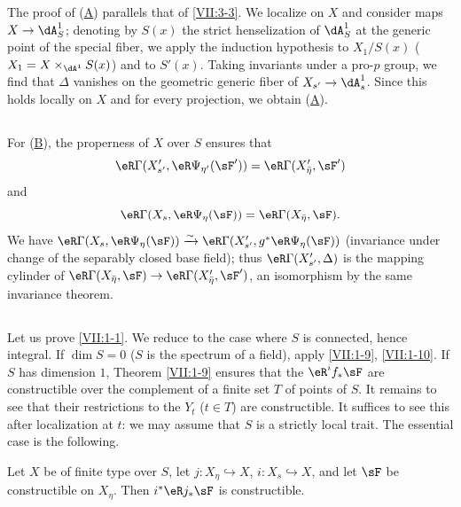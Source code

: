 The proof of (\hyperlink{VII:3-A}{A}) parallels that of \ref{VII:3-3}. We
localize on $X$ and consider maps $X\to \dA_S^1$; denoting by $S(x)$ the
strict henselization of $\dA_S^1$ at the generic point of the special fiber,
we apply the induction hypothesis to $X_1/S(x)$
($X_1=X\times_{\dA^1} S(x)$) and to $S'(x)$. Taking invariants under a pro-$p$
group, we find that $\Delta$ vanishes on the geometric generic fiber of
$X_{s'} \to \dA_s^1$. Since this holds locally on $X$ and for every
projection, we obtain (\hyperlink{VII:3-A}{A}).






\subsection{}\label{VII:3-9}

For (\hyperlink{VII:3-B}{B}), the properness of $X$ over $S$ ensures that
\[
  \eR\Gamma(X_{s'}',\eR\Psi_{\eta'}(\sF')) = \eR\Gamma(X_{\bar\eta}',\sF') 
\]
and
\[
  \eR\Gamma(X_s,\eR\Psi_\eta(\sF)) = \eR\Gamma(X_{\bar\eta},\sF) \text{.} 
\]
We have
$\eR\Gamma(X_s,\eR\Psi_\eta(\sF))\iso \eR\Gamma(X_{s'}',g^\ast\eR\Psi_\eta(\sF))$
(invariance under change of the separably closed base field); thus
$\eR\Gamma(X_{s'}', \Delta)$ is the mapping cylinder of
$\eR\Gamma(X_{\bar\eta},\sF) \to \eR\Gamma(X_{\bar\eta}',\sF')$, an
isomorphism by the same invariance theorem.






\subsection{}\label{VII:3-10}

Let us prove \ref{VII:1-1}. We reduce to the case where $S$ is connected,
hence integral. If $\dim S=0$ ($S$ is the spectrum of a field), apply
\ref{VII:1-9}, \ref{VII:1-10}. If $S$ has dimension $1$, Theorem
\ref{VII:1-9} ensures that the $\eR^i f_\ast \sF$ are constructible over the
complement of a finite set $T$ of points of $S$. It remains to see that their
restrictions to the $Y_t$ ($t\in T$) are constructible. It suffices to see
this after localization at $t$: we may assume that $S$ is a strictly local
trait. The essential case is the following.






\begin{lemma_}\label{VII:3-11}
Let $X$ be of finite type over $S$, let $j:X_\eta\hookrightarrow X$,
$i:X_s\hookrightarrow X$, and let $\sF$ be constructible on $X_\eta$. Then
$i^\ast\eR j_\ast \sF$ is constructible.
\end{lemma_}

